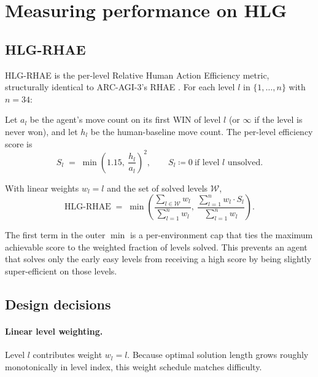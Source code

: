 \section{Measuring performance on HLG}
\label{sec:measuring}

\subsection{HLG-RHAE}
\label{sec:rhae}

HLG-RHAE is the per-level Relative Human Action Efficiency metric, structurally
identical to ARC-AGI-3's RHAE \cite{arcagi3}. For each level $l$ in $\{1,\ldots,n\}$ with
$n=34$:

\begin{definition}\label{def:perlevel}
Let $a_l$ be the agent's move count on its first WIN of level $l$ (or $\infty$ if the
level is never won), and let $h_l$ be the human-baseline move count. The per-level
efficiency score is
\begin{equation}
S_l \;=\; \min\!\left(1.15,\ \frac{h_l}{a_l}\right)^2,
\qquad S_l \coloneqq 0 \ \text{if level $l$ unsolved.}
\label{eq:Sl}
\end{equation}
\end{definition}

\begin{definition}\label{def:rhae}
With linear weights $w_l = l$ and the set of solved levels $\mathcal{W}$,
\begin{equation}
\mathrm{HLG\text{-}RHAE}
\;=\; \min\!\left(
    \frac{\sum_{l\in\mathcal{W}} w_l}{\sum_{l=1}^{n} w_l},\
    \frac{\sum_{l=1}^{n} w_l \cdot S_l}{\sum_{l=1}^{n} w_l}
  \right).
\label{eq:rhae}
\end{equation}
\end{definition}

The first term in the outer $\min$ is a per-environment cap that ties the maximum
achievable score to the weighted fraction of levels solved. This prevents an agent that
solves only the early easy levels from receiving a high score by being slightly
super-efficient on those levels.

\subsection{Design decisions}
\label{sec:scoring-design}

\paragraph{Linear level weighting.} Level $l$ contributes weight $w_l = l$. Because
optimal solution length grows roughly monotonically in level index, this weight schedule
matches difficulty.

